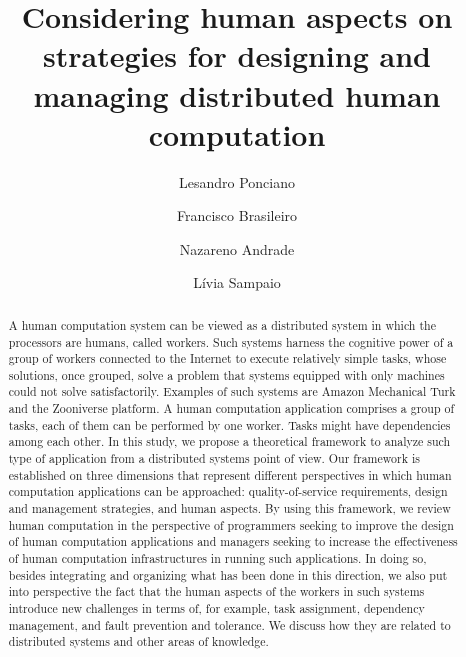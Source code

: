 \documentclass[11pt]{bmc_article_s50}
\begin{document}
\title{Considering human aspects on strategies for designing and managing distributed human computation}

\maketitle

\author[1^{*}]{Lesandro Ponciano}\cor{}

\author[1]{Francisco Brasileiro}

\author[1]{Nazareno Andrade}

\author[1]{L\'{i}via Sampaio}

\address[1]{Federal University of Campina Grande, Department of Computing and Systems, Av.\\\hspace*{59pt}  Apr\'{i}gio Veloso, 882 -- Bloco CO, 58.429-900, Campina Grande -- PB, Brazil}

\begin{abstract}\justifying
A human computation system can be viewed as a distributed system in which the processors are humans, called workers. Such systems harness the cognitive power of a group of workers connected to the Internet to execute relatively simple tasks, whose solutions, once grouped, solve a problem that systems equipped with only machines could not solve satisfactorily. Examples of such systems are Amazon Mechanical Turk and the Zooniverse platform. A human computation application comprises a group of tasks, each of them can be performed by one worker. Tasks might have dependencies among each other. In this study, we propose a theoretical framework to analyze such type of application from a distributed systems point of view. Our framework is established on three dimensions that represent different perspectives in which human computation applications can be approached: quality-of-service requirements, design and management strategies, and human aspects. By using this framework, we review human computation in the perspective of programmers seeking to improve the design of human computation applications and managers seeking to increase the effectiveness of human computation infrastructures in running such applications. In doing so, besides integrating and organizing what has been done in this direction, we also put into perspective the fact that the human aspects of the workers in such systems introduce new challenges in terms of, for example, task assignment, dependency management, and fault prevention and tolerance. We discuss how they are related to distributed systems and other areas of knowledge.


\end{abstract}
\end{document}
